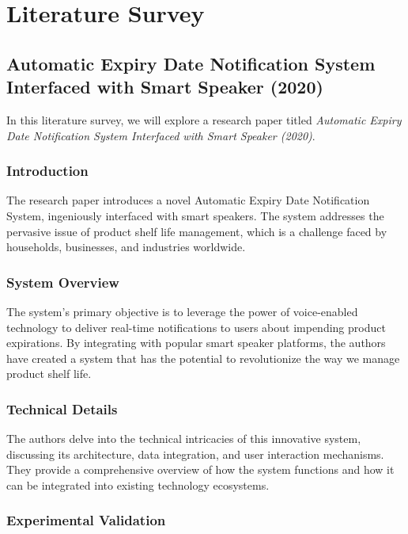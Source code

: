 \chapter{Literature Survey}

\section{Automatic Expiry Date Notification System Interfaced with Smart Speaker (2020)}

In this literature survey, we will explore a research paper titled \textit{Automatic Expiry Date Notification System Interfaced with Smart Speaker (2020)}.

\subsection{Introduction}

The research paper introduces a novel Automatic Expiry Date Notification System, ingeniously interfaced with smart speakers. The system addresses the pervasive issue of product shelf life management, which is a challenge faced by households, businesses, and industries worldwide.

\subsection{System Overview}

The system's primary objective is to leverage the power of voice-enabled technology to deliver real-time notifications to users about impending product expirations. By integrating with popular smart speaker platforms, the authors have created a system that has the potential to revolutionize the way we manage product shelf life.

\subsection{Technical Details}

The authors delve into the technical intricacies of this innovative system, discussing its architecture, data integration, and user interaction mechanisms. They provide a comprehensive overview of how the system functions and how it can be integrated into existing technology ecosystems.

\subsection{Experimental Validation}


